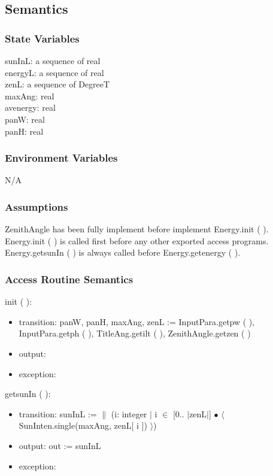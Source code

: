 \documentclass[12pt, titlepage]{article}
\begin{document}
\subsection{Semantics}

\subsubsection{State Variables}
sunInL: a sequence of real\\
energyL: a sequence of real\\
zenL: a sequence of DegreeT\\
maxAng: real\\
avenergy: real\\
panW: real\\
panH: real\\

\subsubsection{Environment Variables}

N/A

\subsubsection{Assumptions}
ZenithAngle has been fully implement before implement Energy.init ( ).\\
Energy.init ( ) is called first before any other exported access programs.\\
Energy.getsunIn ( ) is always called before Energy.getenergy ( ).


\subsubsection{ Access Routine Semantics}

\noindent  init ( ):
\begin{itemize}
\item transition: panW, panH, maxAng, zenL := InputPara.getpw ( ), InputPara.getph ( ), TitleAng.getilt ( ), ZenithAngle.getzen ( )

\item output:
 
\item exception: 
\end{itemize}

\noindent  getsunIn ( ):
\begin{itemize}
\item transition: sunInL := $\|$ (i: integer $|$ i $\in$ [0.. $|$zenL$|$] $\bullet$ $\langle$ SunInten.single(maxAng, zenL[ i ]) $\rangle$)

\item output: out := sunInL
 
\item exception: 
\end{itemize}
\end{document}
